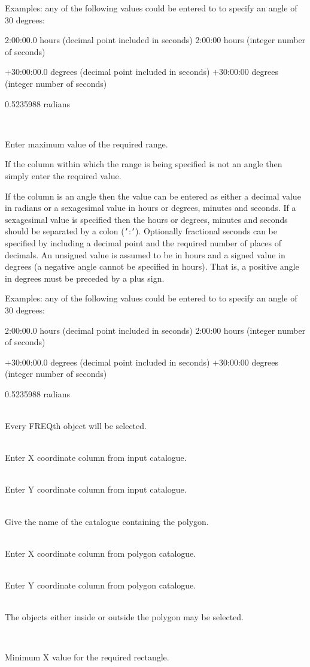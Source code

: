 \documentclass[twoside,11pt]{article}
\renewcommand{\_}{\texttt{\symbol{95}}}
\newcommand{\sstsubsection}[1]{ \item[{#1}] \mbox{} \\}
\newcommand{\sstsubsection}[1]{\item[{#1}]}
\begin{document}
\begin{htmlonly}
{{{         Examples: any of the following values could be entered to
         to specify an angle of 30 degrees:

             2:00:00.0   hours (decimal point included in seconds)
             2:00:00     hours (integer number of seconds)

           $+$30:00:00.0   degrees (decimal point included in seconds)
           $+$30:00:00     degrees (integer number of seconds)

             0.5235988   radians
      }
      \sstsubsection{
         MAXRNG  =  CHARACTER (read)
      }{
         Enter maximum value of the required range.

         If the column within which the range is being specified is
         not an angle then simply enter the required value.

         If the column is an angle then the value can be entered as
         either a decimal value in radians or a sexagesimal value in
         hours or degrees, minutes and seconds.  If a sexagesimal value
         is specified then the hours or degrees, minutes and seconds
         should be separated by a colon ({\tt '}:{\tt '}).  Optionally fractional
         seconds can be specified by including a decimal point and the
         required number of places of decimals.  An unsigned value is
         assumed to be in hours and a signed value in degrees (a
         negative angle cannot be specified in hours).  That is,
         a positive angle in degrees must be preceded by a plus sign.

         Examples: any of the following values could be entered to
         to specify an angle of 30 degrees:

             2:00:00.0   hours (decimal point included in seconds)
             2:00:00     hours (integer number of seconds)

           $+$30:00:00.0   degrees (decimal point included in seconds)
           $+$30:00:00     degrees (integer number of seconds)

             0.5235988   radians
      }
      \sstsubsection{
         FREQ  =  INTEGER (read)
      }{
         Every FREQth object will be selected.
      }
      \sstsubsection{
         XCOL  =  CHARACTER (read)
      }{
         Enter X coordinate column from input catalogue.
      }
      \sstsubsection{
         YCOL  =  CHARACTER (read)
      }{
         Enter Y coordinate column from input catalogue.
      }
      \sstsubsection{
         CATPOLY  =  CHARACTER (read)
      }{
         Give the name of the catalogue containing the polygon.
      }
      \sstsubsection{
         XPLCOL  =  CHARACTER (read)
      }{
         Enter X coordinate column from polygon catalogue.
      }
      \sstsubsection{
         YPLCOL  =  CHARACTER (read)
      }{
         Enter Y coordinate column from polygon catalogue.
      }
      \sstsubsection{
         INSIDE  =  LOGICAL (read)
      }{
         The objects either inside or outside the polygon may be selected.
      }
      \sstsubsection{
         XMIN  =  DOUBLE (read)
      }{
         Minimum X value for the required rectangle.

}}}
\end{htmlonly}
\end{document}
